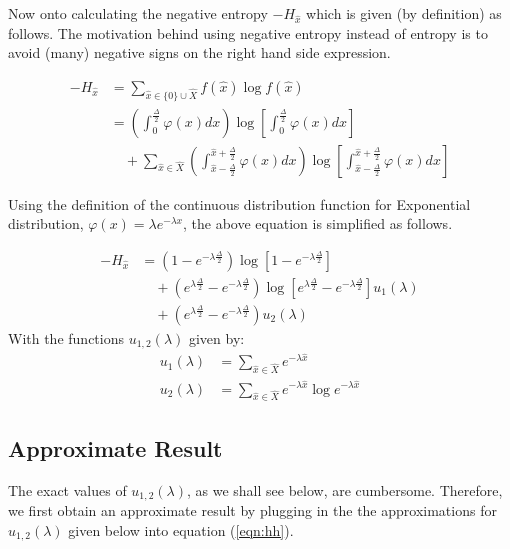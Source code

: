 Now onto calculating the negative entropy $-H_{\hat{x}}$ which is given (by definition) as follows. The motivation behind using negative entropy instead of entropy is to avoid (many) negative signs on the right hand side expression.

\begin{align}-H_{\hat{x}} &= \sum_{\hat{x} \in \{0\} \cup \hat{X}} f(\hat{x}) \log f(\hat{x}) \\ &= \left(\int_{0}^{\frac{\Delta}{2}} \varphi(x) dx \right) \log \left[\int_{0}^{\frac{\Delta}{2}} \varphi(x) dx \right] \nonumber \\ &\quad + \sum_{\hat{x} \in \hat{X}} \left( \int_{\hat{x}-\frac{\Delta}{2}}^{\hat{x}+\frac{\Delta}{2}} \varphi(x) dx \right) \log \left[\int_{\hat{x}-\frac{\Delta}{2}}^{\hat{x}+\frac{\Delta}{2}} \varphi(x) dx \right]\end{align} 

Using the definition of the continuous distribution function for Exponential distribution, $\varphi(x) = \lambda e^{-\lambda x}$, the above equation is simplified as follows.

\begin{align} -H_{\hat{x}} &= \left(1-e^{-\lambda\frac{\Delta}{2}}\right) \log \left[ 1-e^{-\lambda\frac{\Delta}{2}} \right] \nonumber \\ &\quad + \left(e^{\lambda\frac{\Delta}{2}} - e^{-\lambda\frac{\Delta}{2}}\right) \log \left[e^{\lambda\frac{\Delta}{2}} - e^{-\lambda\frac{\Delta}{2}} \right] u_1(\lambda) \nonumber \\ &\quad +  \left(e^{\lambda\frac{\Delta}{2}} - e^{-\lambda\frac{\Delta}{2}}\right) u_2(\lambda) \label{eqn:hh} \end{align}
With the functions $u_{1,2}(\lambda)$ given by:
\begin{align} u_1(\lambda) &= \sum_{\hat{x} \in \hat{X}} e^{-\lambda\hat{x}} \\ u_2(\lambda) &= \sum_{\hat{x} \in \hat{X}} e^{-\lambda\hat{x}} \log e^{-\lambda\hat{x}} \end{align}

\subsection{Approximate Result}

The exact values of $u_{1,2}(\lambda)$, as we shall see below, are cumbersome. Therefore, we first obtain an approximate result by plugging in the the approximations for $u_{1,2}(\lambda)$ given below into equation (\ref{eqn:hh}).

